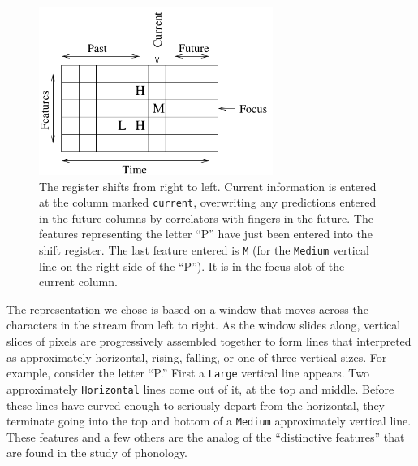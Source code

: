 \documentclass[letterpaper]{article}
\begin{document}


\begin{figure}
\centering
\includegraphics[width=3in]{shift.pdf}
\caption{The register shifts from right to left.  Current information
  is entered at the column marked {\tt current}, overwriting any
  predictions entered in the future columns by correlators with
  fingers in the future.  The features representing the letter ``P''
  have just been entered into the shift register.  The last feature
  entered is {\tt M} (for the {\tt Medium} vertical line on the right side of
  the ``P'').  It is in the focus slot of the current column.}
\label{fig:shift}
\end{figure}

The representation we chose is based on a window that moves across the
characters in the stream from left to right.  As the window slides
along, vertical slices of pixels are progressively assembled together
to form lines that interpreted as approximately horizontal, rising,
falling, or one of three vertical sizes.  For example, consider the
letter ``P.''  First a {\tt Large} vertical line appears.  Two
approximately {\tt Horizontal} lines come out of it, at the top and
middle.  Before these lines have curved enough to seriously depart
from the horizontal, they terminate going into the top and bottom of a
{\tt Medium} approximately vertical line.  These features and a few
others are the analog of the ``distinctive features'' that are found
in the study of phonology.
\end{document}
